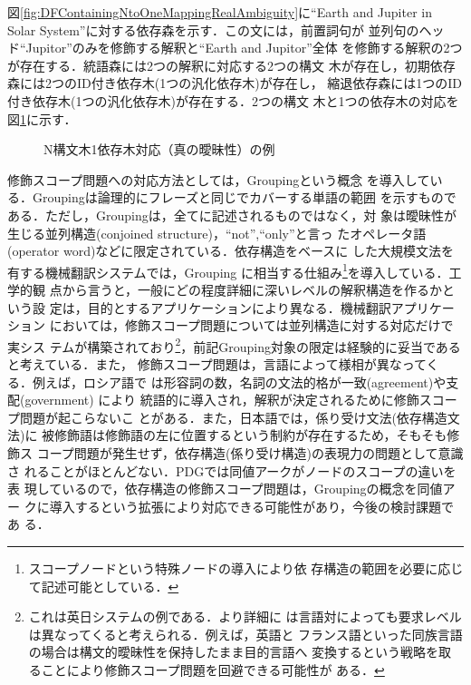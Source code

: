 図\ref{fig:DFContainingNtoOneMappingRealAmbiguity}に``Earth and
Jupiter in Solar System''に対する依存森を示す．この文には，前置詞句が
並列句のヘッド``Jupitor''のみを修飾する解釈と``Earth and Jupitor''全体
を修飾する解釈の2つが存在する．統語森には2つの解釈に対応する2つの構文
木が存在し，初期依存森には2つのID付き依存木(1つの汎化依存木)が存在し，
縮退依存森には1つのID付き依存木(1つの汎化依存木)が存在する．2つの構文
木と1つの依存木の対応を図\ref{fig:RealNtoOneMapping}に示す．

\begin{figure}[b]
\begin{center}
\end{center}
\myfiglabelskip
\caption{N構文木1依存木対応（真の曖昧性）の例}
\label{fig:RealNtoOneMapping}
\end{figure}

修飾スコープ問題への対応方法として\cite{Meluk88}は，Groupingという概念
を導入している．Groupingは論理的にフレーズと同じでカバーする単語の範囲
を示すものである．ただし，Groupingは，全てに記述されるものではなく，対
象は曖昧性が生じる並列構造(conjoined structure)，``not'',``only''と言っ
たオペレータ語(operator word)などに限定されている．依存構造をベースに
した大規模文法を有する機械翻訳システム\cite{Amano89}では，Grouping 
に相当する仕組み\footnote{スコープノードという特殊ノードの導入により依
存構造の範囲を必要に応じて記述可能としている．}を導入している．工学的観
点から言うと，一般にどの程度詳細に深いレベルの解釈構造を作るかという設
定は，目的とするアプリケーションにより異なる．機械翻訳アプリケーション
においては，修飾スコープ問題については並列構造に対する対応だけで実シス
テムが構築されており\footnote{これは英日システムの例である．より詳細に
は言語対によっても要求レベルは異なってくると考えられる．例えば，英語と
フランス語といった同族言語の場合は構文的曖昧性を保持したまま目的言語へ
変換するという戦略を取ることにより修飾スコープ問題を回避できる可能性が
ある．}，前記Grouping対象の限定は経験的に妥当であると考えている．また，
修飾スコープ問題は，言語によって様相が異なってくる．例えば，ロシア語で
は形容詞の数，名詞の文法的格が一致(agreement)や支配(government) により
統語的に導入され，解釈が決定されるために修飾スコープ問題が起こらないこ
とがある\cite{Meluk88}．また，日本語では，係り受け文法(依存構造文法)に
被修飾語は修飾語の左に位置するという制約が存在するため，そもそも修飾ス
コープ問題が発生せず，依存構造(係り受け構造)の表現力の問題として意識さ
れることがほとんどない．PDGでは同値アークがノードのスコープの違いを表
現しているので，依存構造の修飾スコープ問題は，Groupingの概念を同値アー
クに導入するという拡張により対応できる可能性があり，今後の検討課題であ
る．

